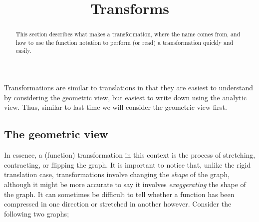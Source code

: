 \documentclass{ximeraXloud}
\title{Transforms}
\begin{document}
\begin{abstract}
    This section describes what makes a transformation, where the name comes from, and how to use the function notation to perform (or read) a transformation quickly and easily.
\end{abstract}
\maketitle
Transformations are similar to translations in that they are easiest to understand by considering the geometric view, but easiest to write down using the analytic view. Thus, similar to last time we will consider the geometric view first.

\subsection*{The geometric view}

    In essence, a (function) transformation in this context is the process of stretching, contracting, or flipping the graph. It is important to notice that, unlike the rigid translation case, transformations involve changing the \textit{shape} of the graph, although it might be more accurate to say it involves \textit{exaggerating} the shape of the graph. It can sometimes be difficult to tell whether a function has been compressed in one direction or stretched in another however. Consider the following two graphs;
    
    \begin{minipage}{\textwidth}
    \end{minipage}
    
\end{document}
